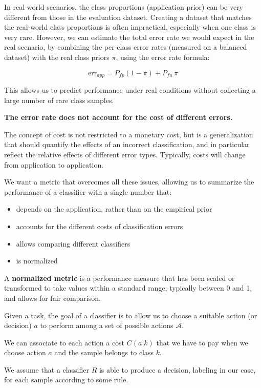 In real-world scenarios, the class proportions (application prior) can be very different from those in the evaluation dataset. Creating a dataset that matches the real-world class proportions is often impractical, especially when one class is very rare. However, we can estimate the total error rate we would expect in the real scenario, by combining the per-class error rates (measured on a balanced dataset) with the real class priors $\pi$, using the error rate formula:

\begin{equation*}
\text{err}_{app} = P_{fp}(1-\pi) + P_{fn}\,\pi
\end{equation*}

This allows us to predict performance under real conditions without collecting a large number of rare class samples.

\textbf{The error rate does not account for the cost of different errors.}

The concept of cost is not restricted to a monetary cost, but is a generalization that should quantify the effects of an incorrect classification, and in particular reflect the relative effects of different error types. Typically, costs will change from application to application.

We want a metric that overcomes all these issues, allowing us to summarize the performance of a classifier with a single number that:
\begin{itemize}
  \item depends on the application, rather than on the empirical prior
  \item accounts for the different costs of classification errors
  \item allows comparing different classifiers
  \item is normalized
\end{itemize}

A \textbf{normalized metric} is a performance measure that has been scaled or transformed to take values within a standard range, typically between 0 and 1, and allows for fair comparison.

Given a task, the goal of a classifier is to allow us to choose a suitable action (or decision) $a$ to perform among a set of possible actions $\mathcal{A}$.

We can associate to each action a cost $C(a|k)$ that we have to pay when we choose action $a$ and the sample belongs to class $k$.

We assume that a classifier $R$ is able to produce a decision, labeling in our case, for each sample according to some rule.


